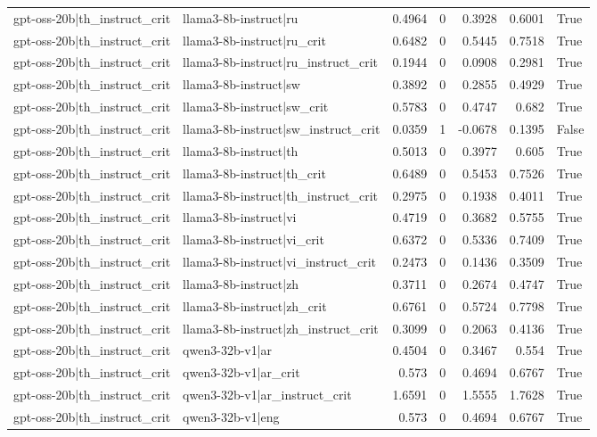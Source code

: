 \begin{table}
\begin{tabular}{l l r r r r l}
gpt-oss-20b|th_instruct_crit & llama3-8b-instruct|ru & 0.4964 & 0 & 0.3928 & 0.6001 & True \\
gpt-oss-20b|th_instruct_crit & llama3-8b-instruct|ru_crit & 0.6482 & 0 & 0.5445 & 0.7518 & True \\
gpt-oss-20b|th_instruct_crit & llama3-8b-instruct|ru_instruct_crit & 0.1944 & 0 & 0.0908 & 0.2981 & True \\
gpt-oss-20b|th_instruct_crit & llama3-8b-instruct|sw & 0.3892 & 0 & 0.2855 & 0.4929 & True \\
gpt-oss-20b|th_instruct_crit & llama3-8b-instruct|sw_crit & 0.5783 & 0 & 0.4747 & 0.682 & True \\
gpt-oss-20b|th_instruct_crit & llama3-8b-instruct|sw_instruct_crit & 0.0359 & 1 & -0.0678 & 0.1395 & False \\
gpt-oss-20b|th_instruct_crit & llama3-8b-instruct|th & 0.5013 & 0 & 0.3977 & 0.605 & True \\
gpt-oss-20b|th_instruct_crit & llama3-8b-instruct|th_crit & 0.6489 & 0 & 0.5453 & 0.7526 & True \\
gpt-oss-20b|th_instruct_crit & llama3-8b-instruct|th_instruct_crit & 0.2975 & 0 & 0.1938 & 0.4011 & True \\
gpt-oss-20b|th_instruct_crit & llama3-8b-instruct|vi & 0.4719 & 0 & 0.3682 & 0.5755 & True \\
gpt-oss-20b|th_instruct_crit & llama3-8b-instruct|vi_crit & 0.6372 & 0 & 0.5336 & 0.7409 & True \\
gpt-oss-20b|th_instruct_crit & llama3-8b-instruct|vi_instruct_crit & 0.2473 & 0 & 0.1436 & 0.3509 & True \\
gpt-oss-20b|th_instruct_crit & llama3-8b-instruct|zh & 0.3711 & 0 & 0.2674 & 0.4747 & True \\
gpt-oss-20b|th_instruct_crit & llama3-8b-instruct|zh_crit & 0.6761 & 0 & 0.5724 & 0.7798 & True \\
gpt-oss-20b|th_instruct_crit & llama3-8b-instruct|zh_instruct_crit & 0.3099 & 0 & 0.2063 & 0.4136 & True \\
gpt-oss-20b|th_instruct_crit & qwen3-32b-v1|ar & 0.4504 & 0 & 0.3467 & 0.554 & True \\
gpt-oss-20b|th_instruct_crit & qwen3-32b-v1|ar_crit & 0.573 & 0 & 0.4694 & 0.6767 & True \\
gpt-oss-20b|th_instruct_crit & qwen3-32b-v1|ar_instruct_crit & 1.6591 & 0 & 1.5555 & 1.7628 & True \\
gpt-oss-20b|th_instruct_crit & qwen3-32b-v1|eng & 0.573 & 0 & 0.4694 & 0.6767 & True \\

\end{tabular}
\end{table}
